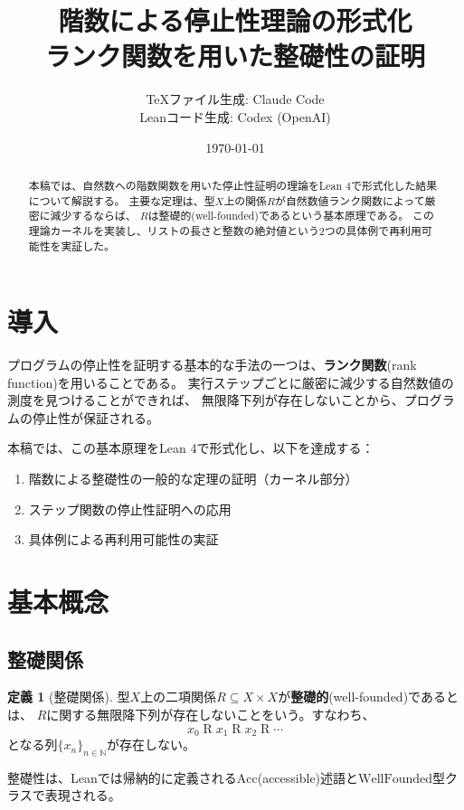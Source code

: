 \documentclass[11pt,a4paper]{ltjsarticle}
\title{階数による停止性理論の形式化\\
  {\large ランク関数を用いた整礎性の証明}}
\author{
  TeXファイル生成: Claude Code\\
  Leanコード生成: Codex (OpenAI)
}
\date{\today}
\theoremstyle{definition}
\newtheorem{definition}{定義}[section]
\begin{document}
\maketitle

\begin{abstract}
本稿では、自然数への階数関数を用いた停止性証明の理論をLean 4で形式化した結果について解説する。
主要な定理は、型$X$上の関係$R$が自然数値ランク関数によって厳密に減少するならば、
$R$は整礎的(well-founded)であるという基本原理である。
この理論カーネルを実装し、リストの長さと整数の絶対値という2つの具体例で再利用可能性を実証した。
\end{abstract}

\tableofcontents

\section{導入}

プログラムの停止性を証明する基本的な手法の一つは、\textbf{ランク関数}(rank function)を用いることである。
実行ステップごとに厳密に減少する自然数値の測度を見つけることができれば、
無限降下列が存在しないことから、プログラムの停止性が保証される。

本稿では、この基本原理をLean 4で形式化し、以下を達成する：
\begin{enumerate}
\item 階数による整礎性の一般的な定理の証明（カーネル部分）
\item ステップ関数の停止性証明への応用
\item 具体例による再利用可能性の実証
\end{enumerate}

\section{基本概念}

\subsection{整礎関係}

\begin{definition}[整礎関係]
型$X$上の二項関係$R \subseteq X \times X$が\textbf{整礎的}(well-founded)であるとは、
$R$に関する無限降下列が存在しないことをいう。すなわち、
\[
x_0 \mathrel{R} x_1 \mathrel{R} x_2 \mathrel{R} \cdots
\]
となる列$\{x_n\}_{n \in \mathbb{N}}$が存在しない。
\end{definition}

整礎性は、Leanでは帰納的に定義される$\mathrm{Acc}$(accessible)述語と$\mathrm{WellFounded}$型クラスで表現される。
\end{document}
